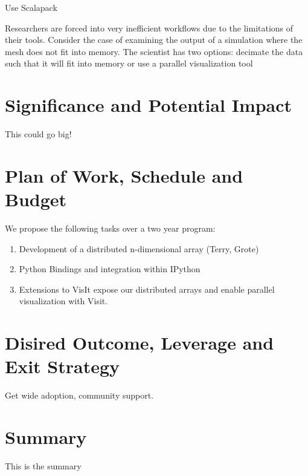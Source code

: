 \documentclass[a4paper]{article}
\begin{document}
Use Scalapack

Researchers are forced into very inefficient workflows due to the limitations of their tools.  Consider the case of examining the output of a simulation where the mesh does not fit into memory.  The scientist has two options: decimate the data such that it will fit into memory or use a parallel visualization tool



\section*{Significance and Potential Impact}
This could go big!

\section*{Plan of Work, Schedule and Budget}

We propose the following tasks over a two year program:

\begin{enumerate}
	\item Development of a distributed n-dimensional array (Terry, Grote)

	\item Python Bindings and integration within IPython

	\item Extensions to VisIt expose our distributed arrays and enable parallel visualization with Visit.
\end{enumerate}


\section*{Disired Outcome, Leverage and Exit Strategy}
Get wide adoption, community support.


\section*{Summary}

This is the summary
\end{document}
